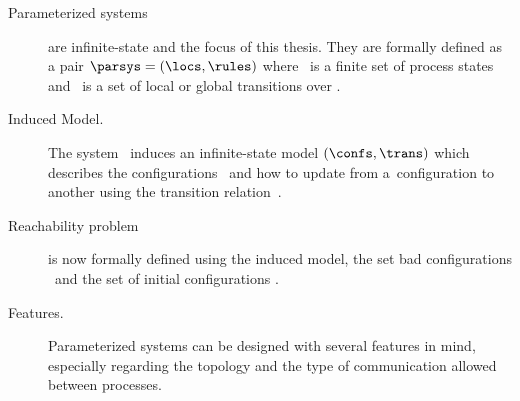 \begin{description}
\item[Parameterized systems] are infinite-state and the focus of this
  thesis. They are formally defined as a pair $\parsys=(\locs,\rules)$
  where \locs\ is a finite set of process states and \ is a set
  of local or global transitions over \locs .
\item[Induced Model.] The system \parsys\ induces an infinite-state
  model $(\confs,\trans)$ which describes the configurations \confs\
  and how to update from a~configuration to another using the
  transition relation~{\trans}.
\item[Reachability problem] is now formally defined using the induced
  model, the set bad configurations \Bad\ and the set of initial
  configurations \Inits .
\item[Features.] Parameterized systems can be designed with several
  features in mind, especially regarding the topology and the type of
  communication allowed between processes.
\end{description}
